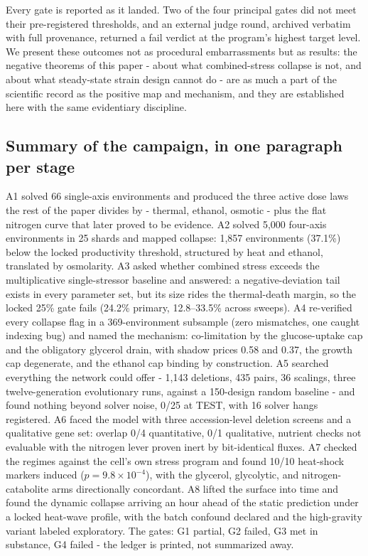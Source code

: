 \documentclass[12pt]{article}
\begin{document}
Every gate is reported as it landed. Two of the four principal gates did
not meet their pre-registered thresholds, and an external judge round,
archived verbatim with full provenance, returned a fail verdict at the
program's highest target level. We present these outcomes not as
procedural embarrassments but as results: the negative theorems of this
paper - about what combined-stress collapse is not, and about what
steady-state strain design cannot do - are as much a part of the
scientific record as the positive map and mechanism, and they are
established here with the same evidentiary discipline.


\subsection{Summary of the campaign, in one paragraph per stage}

A1 solved 66 single-axis environments and produced the three active
dose laws the rest of the paper divides by - thermal, ethanol,
osmotic - plus the flat nitrogen curve that later proved to be
evidence. A2 solved 5{,}000 four-axis environments in 25 shards and
mapped collapse: 1{,}857 environments (37.1\%) below the locked
productivity threshold, structured by heat and ethanol, translated by
osmolarity. A3 asked whether combined stress exceeds the
multiplicative single-stressor baseline and answered: a negative-deviation
tail exists in every parameter set, but its size rides the
thermal-death margin, so the locked 25\% gate fails (24.2\% primary,
12.8--33.5\% across sweeps). A4 re-verified every collapse flag in a
369-environment subsample (zero mismatches, one caught indexing bug)
and named the mechanism: co-limitation by the glucose-uptake cap and
the obligatory glycerol drain, with shadow prices 0.58 and 0.37, the
growth cap degenerate, and the ethanol cap binding by construction.
A5 searched everything the network could offer - 1{,}143 deletions,
435 pairs, 36 scalings, three twelve-generation evolutionary runs,
against a 150-design random baseline - and found nothing beyond
solver noise, 0/25 at TEST, with 16 solver hangs registered. A6 faced
the model with three accession-level deletion screens and a
qualitative gene set: overlap 0/4 quantitative, 0/1 qualitative,
nutrient checks not evaluable with the nitrogen lever proven inert
by bit-identical fluxes. A7 checked the regimes against the cell's
own stress program and found 10/10 heat-shock markers induced
($p=9.8\times10^{-4}$), with the glycerol, glycolytic, and
nitrogen-catabolite arms directionally concordant. A8 lifted the
surface into time and found the dynamic collapse arriving an hour
ahead of the static prediction under a locked heat-wave profile, with
the batch confound declared and the high-gravity variant labeled
exploratory. The gates: G1 partial, G2 failed, G3 met in substance,
G4 failed - the ledger is printed, not summarized away.
\end{document}
